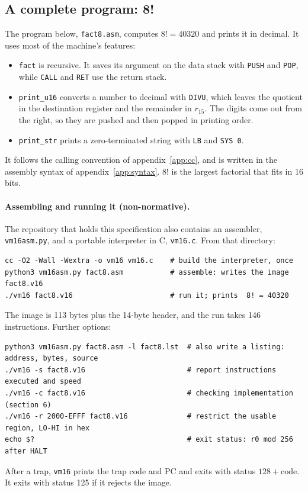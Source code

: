\documentclass[11pt,a4paper]{article}
\newcommand{\op}[1]{\texttt{#1}}
\newcommand{\R}[1]{r_{#1}}
\begin{document}
\subsection{A complete program: 8!}\label{sec:fact8}

The program below, \texttt{fact8.asm}, computes $8! = 40320$ and prints it in
decimal. It uses most of the machine's features:
\begin{itemize}[nosep]
\item \texttt{fact} is recursive. It saves its argument on the data stack
  with \op{PUSH} and \op{POP}, while \op{CALL} and \op{RET} use the return
  stack.
\item \texttt{print\_u16} converts a number to decimal with \op{DIVU}, which
  leaves the quotient in the destination register and the remainder in
  $\R{15}$. The digits come out from the right, so they are pushed and then
  popped in printing order.
\item \texttt{print\_str} prints a zero-terminated string with \op{LB} and
  \op{SYS 0}.
\end{itemize}
It follows the calling convention of appendix~\ref{app:cc}, and is written in
the assembly syntax of appendix~\ref{app:syntax}. $8!$ is the largest factorial that
fits in 16 bits.



\paragraph{Assembling and running it (non-normative).}
The repository that holds this specification also contains an assembler,
\texttt{vm16asm.py}, and a portable interpreter in C, \texttt{vm16.c}.
From that directory:
\begin{lstlisting}[style=shell]
cc -O2 -Wall -Wextra -o vm16 vm16.c    # build the interpreter, once
python3 vm16asm.py fact8.asm           # assemble: writes the image fact8.v16
./vm16 fact8.v16                       # run it; prints  8! = 40320
\end{lstlisting}
The image is 113 bytes plus the 14-byte header, and the run takes 146
instructions. Further options:
\begin{lstlisting}[style=shell]
python3 vm16asm.py fact8.asm -l fact8.lst  # also write a listing: address, bytes, source
./vm16 -s fact8.v16                        # report instructions executed and speed
./vm16 -c fact8.v16                        # checking implementation (section 6)
./vm16 -r 2000-EFFF fact8.v16              # restrict the usable region, LO-HI in hex
echo $?                                    # exit status: r0 mod 256 after HALT
\end{lstlisting}
After a trap, \texttt{vm16} prints the trap code and PC and exits with status
$128 + \text{code}$. It exits with status 125 if it rejects the image.
\end{document}
